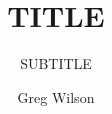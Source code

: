 \documentclass[krantzl]{tex/krantz}
\begin{document}
\title{TITLE}
\subtitle{SUBTITLE}
\author{Greg Wilson}
\maketitle

\frontmatter
\tableofcontents

\mainmatter
\end{document}
